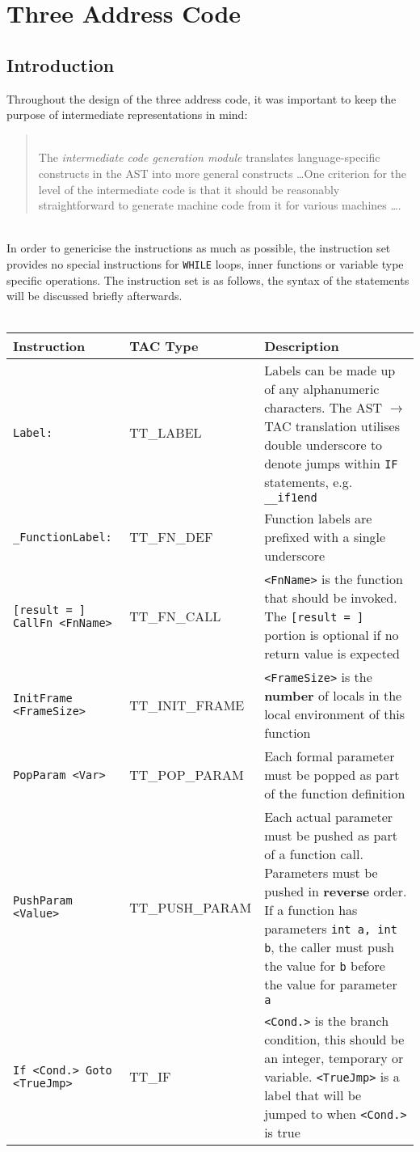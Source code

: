\chapter{Three Address Code}
\section{Introduction}
\label{sec:tacintro}
Throughout the design of the three address code, it was important to keep the purpose of intermediate representations in mind:

\begin{quotation}
	\ \\The \emph{intermediate code generation module} translates language-specific constructs in the AST into more general constructs \ldots One criterion for the level of the intermediate code is that it should be reasonably straightforward to generate machine code from it for various machines \ldots \cite{grune2000}.
\end{quotation}
\ \\
In order to genericise the instructions as much as possible, the instruction set provides no special instructions for \verb!WHILE! loops, inner functions or variable type specific operations. The instruction set is as follows, the syntax of the statements will be discussed briefly afterwards.
\ \\ \ \\
\begin{tabular}{|p{5.5cm}|p{3.5cm}|p{7cm}|}
	\hline
	\textbf{Instruction} & \textbf{TAC Type} & \textbf{Description} \\ \hline
	\verb!Label:! & TT\_LABEL & Labels can be made up of any alphanumeric characters. The AST $\rightarrow$ TAC translation utilises double underscore to denote jumps within \verb!IF! statements, e.g. \verb!__if1end! \\ \hline
	\verb!_FunctionLabel:! & TT\_FN\_DEF & Function labels are prefixed with a single underscore \\ \hline
	\verb![result = ] CallFn <FnName>! & TT\_FN\_CALL & \verb!<FnName>! is the function that should be invoked. The \verb![result = ]! portion is optional if no return value is expected \\ \hline
	\verb!InitFrame <FrameSize>! & TT\_INIT\_FRAME & \verb!<FrameSize>! is the \textbf{number} of locals in the local environment of this function \\ \hline
	\verb!PopParam <Var>! & TT\_POP\_PARAM & Each formal parameter must be popped as part of the function definition \\ \hline
	\verb!PushParam <Value>! & TT\_PUSH\_PARAM & Each actual parameter must be pushed as part of a function call. Parameters must be pushed in \textbf{reverse} order. If a function has parameters \verb!int a, int b!, the caller must push the value for \verb!b! before the value for parameter \verb!a!\\ \hline
	\verb!If <Cond.> Goto <TrueJmp>! & TT\_IF & \verb!<Cond.>! is the branch condition, this should be an integer, temporary or variable. \verb!<TrueJmp>! is a label that will be jumped to when \verb!<Cond.>! is true\\ \hline
\end{tabular}
